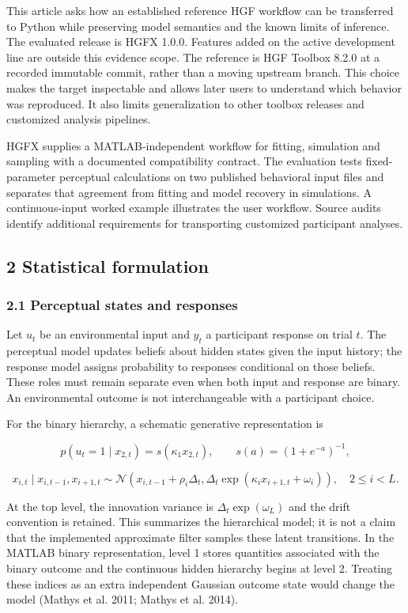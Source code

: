\documentclass[
  11pt,
]{article}
\begin{document}
This article asks how an established reference HGF workflow can be
transferred to Python while preserving model semantics and the known
limits of inference. The evaluated release is HGFX 1.0.0. Features added
on the active development line are outside this evidence scope. The
reference is HGF Toolbox 8.2.0 at a recorded immutable commit, rather
than a moving upstream branch. This choice makes the target inspectable
and allows later users to understand which behavior was reproduced. It
also limits generalization to other toolbox releases and customized
analysis pipelines.

HGFX supplies a MATLAB-independent workflow for fitting, simulation and
sampling with a documented compatibility contract. The evaluation tests
fixed-parameter perceptual calculations on two published behavioral
input files and separates that agreement from fitting and model recovery
in simulations. A continuous-input worked example illustrates the user
workflow. Source audits identify additional requirements for
transporting customized participant analyses.

\subsection{2 Statistical formulation}\label{statistical-formulation}

\subsubsection{2.1 Perceptual states and
responses}\label{perceptual-states-and-responses}

Let \(u_t\) be an environmental input and \(y_t\) a participant response
on trial \(t\). The perceptual model updates beliefs about hidden states
given the input history; the response model assigns probability to
responses conditional on those beliefs. These roles must remain separate
even when both input and response are binary. An environmental outcome
is not interchangeable with a participant choice.

For the binary hierarchy, a schematic generative representation is

\[
p(u_t=1\mid x_{2,t})=s(\kappa_1x_{2,t}),\qquad s(a)=(1+e^{-a})^{-1},
\]

\[
x_{i,t}\mid x_{i,t-1},x_{i+1,t}\sim
\mathcal N\!\left(x_{i,t-1}+\rho_i\Delta_t,
\Delta_t\exp(\kappa_ix_{i+1,t}+\omega_i)\right),\quad 2\le i<L.
\]

At the top level, the innovation variance is \(\Delta_t\exp(\omega_L)\)
and the drift convention is retained. This summarizes the hierarchical
model; it is not a claim that the implemented approximate filter samples
these latent transitions. In the MATLAB binary representation, level 1
stores quantities associated with the binary outcome and the continuous
hidden hierarchy begins at level 2. Treating these indices as an extra
independent Gaussian outcome state would change the model (Mathys et al.
2011; Mathys et al. 2014).
\end{document}
